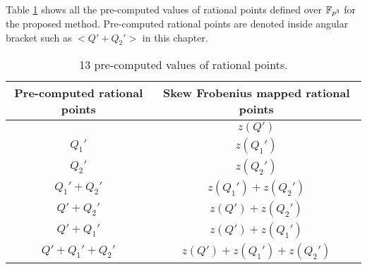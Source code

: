 Table \ref{table:pre-compute_chapter_g2scm_kss18} shows all the pre-computed values of rational points defined over $\mathbb{F}_{p^3}$ for the proposed method. 
Pre-computed rational points are denoted inside angular bracket such as $<Q'+Q_2'>$ in this chapter. 

\renewcommand{\baselinestretch}{1.5}
\begin{table}[!ht]
	\centering
	\caption{13 pre-computed values of rational points.}
	\label{table:pre-compute_chapter_g2scm_kss18}
	\begin{tabular}{|c|c|}
		\hline 
		Pre-computed rational points & Skew Frobenius mapped rational points\\ 
		\hline 
		& $z(Q')$ \\ 
		\hline 
		$Q_1'$ & $z(Q_1')$  \\ 
		\hline 
		$Q_2'$ & $z(Q_2')$ \\ 
		\hline 
		$Q_1'+Q_2'$ & \quad  $ z(Q_1')+ z(Q_2') $ \quad \\ 
		\hline 
		$Q'+Q_2'$ & $ z(Q')+ z(Q_2') $ \\ 
		\hline 
		$Q'+Q_1'$ & $  z(Q')+ z(Q_1') $ \\ 
		\hline 
		\quad $Q'+Q_1'+Q_2'$ \quad  \quad &   \quad  $ z(Q')+ z(Q_1')+ z(Q_2')$  \quad \\ 
		\hline 
	\end{tabular} 
\end{table}
\renewcommand{\baselinestretch}{1.0}

